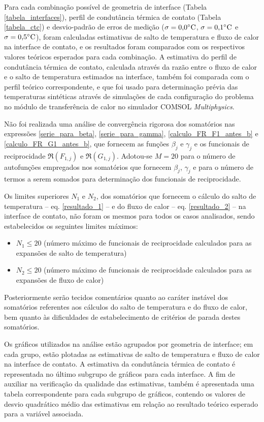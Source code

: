 Para cada combinação possível de geometria de interface (Tabela \ref{tabela_interfaces}), perfil de condutância térmica de contato (Tabela \ref{tabela_ctc}) e desvio-padrão de erros de medição ($\sigma = \text{0,0}\celsius$, $\sigma = \text{0,1}\celsius$ e $\sigma = \text{0,5}\celsius$), foram calculadas estimativas de salto de temperatura e fluxo de calor na interface de contato, e os resultados foram comparados com os respectivos valores teóricos esperados para cada combinação. A estimativa do perfil de condutância térmica de contato, calculada através da razão entre o fluxo de calor e o salto de temperatura estimados na interface, também foi comparada com o perfil teórico correspondente, e que foi usado para determinação prévia das temperaturas sintéticas através de simulações de cada configuração do problema no módulo de transferência de calor no simulador COMSOL \textit{Multiphysics}\textsuperscript{\textregistered}.

Não foi realizada uma análise de convergência rigorosa dos somatórios nas expressões \eqref{serie_para_beta}, \eqref{serie_para_gamma}, \eqref{calculo_FR_F1_antes_b} e \eqref{calculo_FR_G1_antes_b}, que fornecem as funções $\beta_j$ e $\gamma_j$ e os funcionais de reciprocidade $\Re(F_{1,j})$ e $\Re(G_{1,j})$. Adotou-se $M=20$ para o número de autofunções empregados nos somatórios que fornecem $\beta_j$, $\gamma_j$ e para o número de termos a serem somados para determinação dos funcionais de reciprocidade.

Os limites superiores $N_1$ e $N_2$, dos somatórios que fornecem o cálculo do salto de temperatura -- eq. \eqref{resultado_1} -- e do fluxo de calor -- eq. \eqref{resultado_2} -- na interface de contato, não foram os mesmos para todos os casos analisados, sendo estabelecidos os seguintes limites máximos:
\begin{itemize}
	\item $N_1 \le 20$ (número máximo de funcionais de reciprocidade calculados para as expansões de salto de temperatura)
	\item $N_2 \le 20$ (número máximo de funcionais de reciprocidade calculados para as expansões de fluxo de calor)
\end{itemize}

Posteriormente serão tecidos comentários quanto ao caráter instável dos somatórios referentes aos cálculos do salto de temperatura e do fluxo de calor, bem quanto às dificuldades de estabelecimento de critérios de parada destes somatórios.

Os gráficos utilizados na análise estão agrupados por geometria de interface; em cada grupo, estão plotadas as estimativas de salto de temperatura e fluxo de calor na interface de contato. A estimativa da condutância térmica de contato é representada no último subgrupo de gráficos para cada interface. A fim de auxiliar na verificação da qualidade das estimativas, também é apresentada uma tabela correspondente para cada subgrupo de gráficos, contendo os valores de desvio quadrático médio das estimativas em relação ao resultado teórico esperado para a variável associada.

